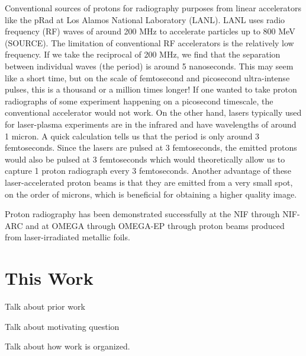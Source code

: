 Conventional sources of protons for radiography purposes from linear accelerators like the pRad at Los Alamos National Laboratory (LANL). LANL uses radio frequency (RF) waves of around 200 MHz to accelerate particles up to 800 MeV (SOURCE). The limitation of conventional RF accelerators is the relatively low frequency. If we take the reciprocal of 200 MHz, we find that the separation between individual waves (the period) is around 5 nanoseconds. This may seem like a short time, but on the scale of femtosecond and picosecond ultra-intense pulses, this is a thousand or a million times longer! If one wanted to take proton radiographs of some experiment happening on a picosecond timescale, the conventional accelerator would not work. On the other hand, lasers typically used for laser-plasma experiments are in the infrared and have wavelengths of around 1 micron. A quick calculation tells us that the period is only around 3 femtoseconds. Since the lasers are pulsed at 3 femtoseconds, the emitted protons would also be pulsed at 3 femtoseconds which would theoretically allow us to capture 1 proton radiograph every 3 femtoseconds. Another advantage of these laser-accelerated proton beams is that they are emitted from a very small spot, on the order of microns, which is beneficial for obtaining a higher quality image.

Proton radiography has been demonstrated successfully at the NIF through NIF-ARC \cite{Simpson_2021_PPCF} and at OMEGA through OMEGA-EP \cite{Zylstra_2012_RSI} through proton beams produced from laser-irradiated metallic foils.


\section{This Work}


Talk about prior work 


Talk about motivating question 


Talk about how work is organized. 



